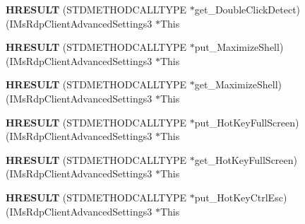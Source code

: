 \begin{DoxyCompactItemize}
\item 
\mbox{\label{struct_i_ms_rdp_client_advanced_settings3_vtbl_a5018d7a8659bc399b6d99b41c88b0f5f}} 
{\bfseries H\+R\+E\+S\+U\+LT} (S\+T\+D\+M\+E\+T\+H\+O\+D\+C\+A\+L\+L\+T\+Y\+PE $\ast$get\+\_\+\+Double\+Click\+Detect)(I\+Ms\+Rdp\+Client\+Advanced\+Settings3 $\ast$This
\item 
\mbox{\label{struct_i_ms_rdp_client_advanced_settings3_vtbl_af8f0ab64283f9e3c6ebfaf4c554cb1b4}} 
{\bfseries H\+R\+E\+S\+U\+LT} (S\+T\+D\+M\+E\+T\+H\+O\+D\+C\+A\+L\+L\+T\+Y\+PE $\ast$put\+\_\+\+Maximize\+Shell)(I\+Ms\+Rdp\+Client\+Advanced\+Settings3 $\ast$This
\item 
\mbox{\label{struct_i_ms_rdp_client_advanced_settings3_vtbl_aa180935cf758f8ea7df4e50f66a32849}} 
{\bfseries H\+R\+E\+S\+U\+LT} (S\+T\+D\+M\+E\+T\+H\+O\+D\+C\+A\+L\+L\+T\+Y\+PE $\ast$get\+\_\+\+Maximize\+Shell)(I\+Ms\+Rdp\+Client\+Advanced\+Settings3 $\ast$This
\item 
\mbox{\label{struct_i_ms_rdp_client_advanced_settings3_vtbl_a25463cad3cccaa9e0998b6d7e23fd628}} 
{\bfseries H\+R\+E\+S\+U\+LT} (S\+T\+D\+M\+E\+T\+H\+O\+D\+C\+A\+L\+L\+T\+Y\+PE $\ast$put\+\_\+\+Hot\+Key\+Full\+Screen)(I\+Ms\+Rdp\+Client\+Advanced\+Settings3 $\ast$This
\item 
\mbox{\label{struct_i_ms_rdp_client_advanced_settings3_vtbl_add2d314a52729e3b38e1e1a04c669e4b}} 
{\bfseries H\+R\+E\+S\+U\+LT} (S\+T\+D\+M\+E\+T\+H\+O\+D\+C\+A\+L\+L\+T\+Y\+PE $\ast$get\+\_\+\+Hot\+Key\+Full\+Screen)(I\+Ms\+Rdp\+Client\+Advanced\+Settings3 $\ast$This
\item 
\mbox{\label{struct_i_ms_rdp_client_advanced_settings3_vtbl_a47f0368529fdda43f78f1f2f63376502}} 
{\bfseries H\+R\+E\+S\+U\+LT} (S\+T\+D\+M\+E\+T\+H\+O\+D\+C\+A\+L\+L\+T\+Y\+PE $\ast$put\+\_\+\+Hot\+Key\+Ctrl\+Esc)(I\+Ms\+Rdp\+Client\+Advanced\+Settings3 $\ast$This
\item 
\mbox{\label{struct_i_ms_rdp_client_advanced_settings3_vtbl_a6e444bf8e6dd65db65b0eb602bcdfdbe}} 

\end{DoxyCompactItemize}
